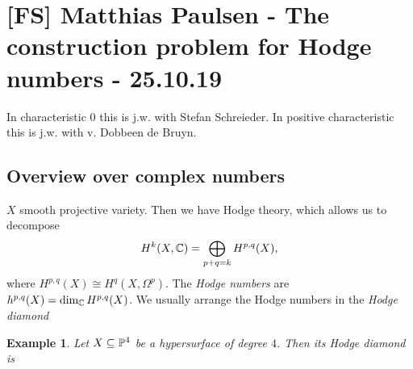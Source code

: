 \documentclass[A4paper, british, reqno]{amsart}
\theoremstyle{darkgreentheorem}
\theoremstyle{darkbluedefinition}
\theoremstyle{darkredexample}
\newtheorem{exa}[thm]{Example}
\theoremstyle{remark}
\newcommand{\1}{\mathbbm{1}}
\begin{document}
\section{[FS] Matthias Paulsen - The construction problem for Hodge numbers - 25.10.19}

In characteristic $0$ this is j.w. with Stefan Schreieder.
In positive characteristic this is j.w. with v. Dobbeen de Bruyn.

\subsection{Overview over complex numbers}

$X$ smooth projective variety.
Then we have Hodge theory, which allows us to decompose
\[ H^{k}(X,\C)=\bigoplus_{p+q=k}H^{p,q}(X), \]
where $H^{p,q}(X)\cong H^{q}(X,\Omega^{p})$.
The \textit{Hodge numbers} are $h^{p,q}(X)=\dim_{\C}H^{p,q}(X)$.
We usually arrange the Hodge numbers in the \textit{Hodge diamond}
\begin{center}
\end{center}

\begin{exa}
    Let $X\subseteq \P^{4}$ be a hypersurface of degree $4$.
    Then its Hodge diamond is
    \begin{center}
    \end{center}
\end{exa}
\end{document}
